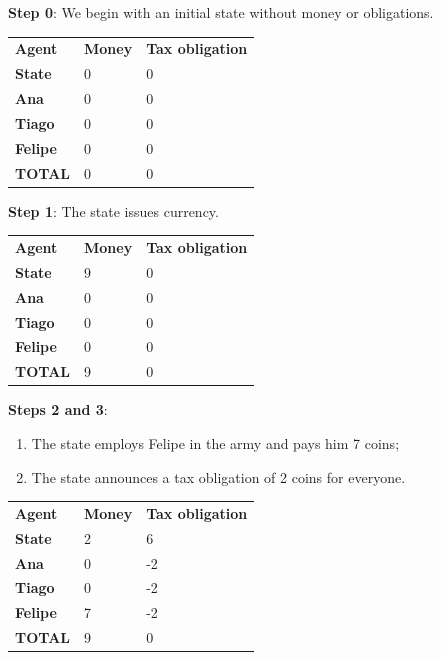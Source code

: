  
 \textbf{Step 0}: We begin with an initial state without money or obligations.

\begin{table}
\centering

\begin{tabular}{l l l}
\textbf{Agent} & \textbf{Money} & \textbf{Tax obligation} \\

\textbf{State} & 0 & 0 \\
\textbf{Ana} & 0 & 0 \\
\textbf{Tiago} & 0 & 0 \\
\textbf{Felipe} & 0 & 0 \\
\textbf{TOTAL} & 0 & 0 \\

\end{tabular}

\end{table}

\textbf{Step 1}: The state issues currency.

\begin{table}
\centering

\begin{tabular}{l l l}
\textbf{Agent} & \textbf{Money} & \textbf{Tax obligation} \\

\textbf{State} & 9 & 0 \\
\textbf{Ana} & 0 & 0 \\
\textbf{Tiago} & 0 & 0 \\
\textbf{Felipe} & 0 & 0 \\
\textbf{TOTAL} & 9 & 0 \\

\end{tabular}

\end{table}

\textbf{Steps 2 and 3}:

\begin{enumerate}
    \item The state employs Felipe in the army and pays him 7 coins;
    \item The state announces a tax obligation of 2 coins for everyone.
\end{enumerate}

\begin{table}
\centering

\begin{tabular}{l l l}
\textbf{Agent} & \textbf{Money} & \textbf{Tax obligation} \\

\textbf{State} & 2 & 6 \\
\textbf{Ana} & 0 & -2 \\
\textbf{Tiago} & 0 & -2 \\
\textbf{Felipe} & 7 & -2 \\
\textbf{TOTAL} & 9 & 0 \\

\end{tabular}

\end{table}

